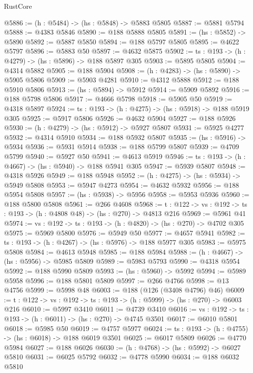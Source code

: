 \begin{lexlean}{RustCore}
\begin{coremodule}
@5886 := (h : @5484) -> (hs : @5848) -> @5883 @5805
@5887 := @5881 @5794
@5888 := @4383 @5846
@5890 := @188 @5888 @5805
@5891 := (hs : @5852) -> @5890
@5892 := @5887 @5850
@5894 := @188 @5797 @5805
@5895 := @4622 @5797
@5896 := @5883 @50
@5897 := @4632 @5875
@5902 := {ts : @193} -> (h : @4279) -> (hs : @5896) -> @188 @5897 @305
@5903 := @5895 @5805
@5904 := @4314 @5882
@5905 := @188 @5904
@5908 := (h : @4283) -> (hs : @5890) -> @5905 @5806
@5909 := @5903 @4281
@5910 := @4312 @5888
@5912 := @188 @5910 @5806
@5913 := (hs : @5894) -> @5912
@5914 := @5909 @5892
@5916 := @188 @5798 @5806
@5917 := @4666 @5798
@5918 := @5905 @50
@5919 := @4318 @5897
@5924 := {ts : @193} -> (h : @4275) -> (hs : @5918) -> @188 @5919 @305
@5925 := @5917 @5806
@5926 := @4632 @5904
@5927 := @188 @5926
@5930 := (h : @4279) -> (hs : @5912) -> @5927 @5807
@5931 := @5925 @4277
@5932 := @4314 @5910
@5934 := @188 @5932 @5807
@5935 := (hs : @5916) -> @5934
@5936 := @5931 @5914
@5938 := @188 @5799 @5807
@5939 := @4709 @5799
@5940 := @5927 @50
@5941 := @4613 @5919
@5946 := {ts : @193} -> (h : @4667) -> (hs : @5940) -> @188 @5941 @305
@5947 := @5939 @5807
@5948 := @4318 @5926
@5949 := @188 @5948
@5952 := (h : @4275) -> (hs : @5934) -> @5949 @5808
@5953 := @5947 @4273
@5954 := @4632 @5932
@5956 := @188 @5954 @5808
@5957 := (hs : @5938) -> @5956
@5958 := @5953 @5936
@5960 := @188 @5800 @5808
@5961 := @266 @4608
@5968 := {t : @122} -> {vs : @192} -> {ts : @193} -> (h : @4808 @48) -> (hs : @270) -> @4813 @216
@5969 := @5961 @41
@5974 := {vs : @192} -> {ts : @193} -> (h : @4820) -> (hs : @270) -> @4702 @305
@5975 := @5969 @5800
@5976 := @5949 @50
@5977 := @4657 @5941
@5982 := {ts : @193} -> (h : @4267) -> (hs : @5976) -> @188 @5977 @305
@5983 := @5975 @5808
@5984 := @4613 @5948
@5985 := @188 @5984
@5988 := (h : @4667) -> (hs : @5956) -> @5985 @5809
@5989 := @5983 @5793
@5990 := @4318 @5954
@5992 := @188 @5990 @5809
@5993 := (hs : @5960) -> @5992
@5994 := @5989 @5958
@5996 := @188 @5801 @5809
@5997 := @266 @4766
@5998 := @13 @4756
@5999 := @5998 @48
@6003 := @188 (@126 (@3408 @4796) @46)
@6009 := {t : @122} -> {vs : @192} -> {ts : @193} -> (h : @5999) -> (hs : @270) -> @6003 @216
@6010 := @5997 @3410
@6011 := @4739 @3410
@6016 := {vs : @192} -> {ts : @193} -> (h : @6011) -> (hs : @270) -> @4745 @3501
@6017 := @6010 @5801
@6018 := @5985 @50
@6019 := @4757 @5977
@6024 := {ts : @193} -> (h : @4755) -> (hs : @6018) -> @188 @6019 @3501
@6025 := @6017 @5809
@6026 := @4770 @5984
@6027 := @188 @6026
@6030 := (h : @4768) -> (hs : @5992) -> @6027 @5810
@6031 := @6025 @5792
@6032 := @4778 @5990
@6034 := @188 @6032 @5810

\end{coremodule}
\end{lexlean}
